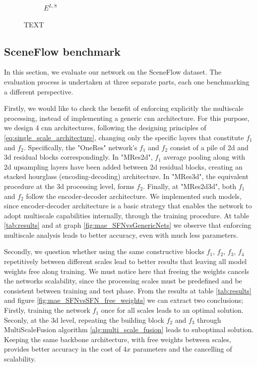 \documentclass[10pt]{article}
\begin{document}
\begin{figure}[t]
{\begin{subfigure}[b]{0.28\textwidth}
        \vspace{-15pt}     
        \caption{$E^{L,8}$}
    \end{subfigure}         
}
\vspace{-15pt}
\caption{TEXT}
\label{fig:EMAPs}  
\vspace{-3pt}      
\end{figure}

\subsection{SceneFlow benchmark} \label{sec:4_2}

In this section, we evaluate our network on the SceneFlow dataset. The evaluation process is undertaken at three separate parts, each one benchmarking a different perspective.

Firstly, we would like to check the benefit of enforcing explicitly the multiscale processing, instead of implementing a generic cnn architecture. For this purpose, we design 4 cnn architectures, following the designing principles of \ref{eq:single_scale_architecture}, changing only the specific layers that constitute $f_1$ and $f_2$. Specifically, the "OneRes" network's $f_1$ and $f_2$ consist of a pile of 2d and 3d residual blocks correspondingly. In "MRes2d", $f_1$ average pooling along with 2d upsampling layers have been added between 2d residual blocks, creating an stacked hourglass (encoding-decoding) architecture. In "MRes3d", the equivalent procedure at the 3d processing level, forms $f_2$. Finally, at "MRes2d3d", both $f_1$ and $f_2$ follow the encoder-decoder architecture. We implemented such models, since encoder-decoder architecture is a basic strategy that enables the network to adopt multiscale capabilities internally, through the training procedure. At table \ref{tab:results} and at graph \ref{fig:mae_SFNvsGenericNets} we observe that enforcing multiscale analysis leads to better accuracy, even with much less parameters.

Secondly, we question whether using the same constructive blocks $f_1$, $f_2$, $f_3$, $f_4$ repetitively between different scales lead to better results that leaving all model weights free along training. We must notice here that freeing the weights cancels the networks scalability, since the processing scales must be predefined and be consistent between training and test phase. From the results at table \ref{tab:results} and figure \ref{fig:mae_SFNvsSFN_free_weights} we can extract two conclusions; Firstly, training the network $f_1$ once for all scales leads to an optimal solution. Seconly, at the 3d level, repeating the building block $f_2$ and $f_3$ through MultiScaleFusion algorithm \ref{alg:multi_scale_fusion} leads to suboptimal solution. Keeping the same backbone architecture, with free weights between scales, provides better accuracy in the cost of $4x$ parameters and the cancelling of scalability.
\end{document}
